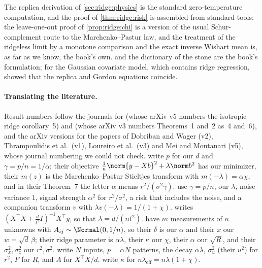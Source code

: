 \begin{refsection}
The replica derivation of \cref{sec:ridge:physics} is the standard zero-temperature computation, and the proof of \cref{thm:ridge:risk} is assembled from standard tools: the leave-one-out proof of \cref{prop:ridge:chi} is a version of the usual Schur-complement route to the Marchenko--Pastur law, and the treatment of the ridgeless limit by a monotone comparison and the exact inverse Wishart mean is, as far as we know, the book's own.  and the dictionary of the stone are the book's formulation; for the Gaussian covariate model, which contains ridge regression, \textcite[Appendix~C]{LoureiroEtAl2022} showed that the replica and Gordon equations coincide.

\paragraph{Translating the literature.} Result numbers follow the journals for \textcite{HastieEtAl2022} (whose arXiv v5 numbers the isotropic ridge corollary~5) and \textcite{BartlettEtAl2020} (whose arXiv v3 numbers Theorems~1 and~2 as~4 and~6), and the arXiv versions for the papers of Dobriban and Wager (v2), Thrampoulidis et al.\ (v1), Loureiro et al.\ (v3) and Mei and Montanari (v5), whose journal numbering we could not check. \textcite{HastieEtAl2022} write $p$ for our $d$ and $\gamma=p/n=1/\alpha$; their objective $\frac1n\norm{y-Xb}^2+\lambda\norm b^2$ has our minimizer, their $m(z)$ is the Marchenko--Pastur Stieltjes transform with $m(-\lambda)=\alpha\chi$, and in their Theorem~7 the letter $\alpha$ means $r^2/(\sigma^2\gamma)$. \textcite{DobribanWager2018} use $\gamma=p/n$, our $\lambda$, noise variance $1$, signal strength $\alpha^2$ for $r^2/\sigma^2$, a risk that includes the noise, and a companion transform $v$ with $\lambda v(-\lambda)=1/(1+\chi)$. \textcite{Dicker2016} writes $(X^\top X+\frac d{t^2}I)^{-1}X^\top y$, so that $\lambda=d/(nt^2)$. \textcite{ThrampoulidisAbbasiHassibi2018} have $m$ measurements of $n$ unknowns with $A_{ij}\sim\Normal(0,1/n)$, so their $\delta$ is our $\alpha$ and their $x$ our $w=\sqrt d\,\beta$; their ridge parameter is $\alpha\lambda$, their $\kappa$ our $\chi$, their $\alpha$ our $\sqrt R$, and their $\sigma_x^2,\sigma_z^2$ our $r^2,\sigma^2$. \textcite{KroghHertz1991} write $N$ inputs, $p=\alpha N$ patterns, the decay $\alpha\lambda$, $\sigma_u^2$ (their $u^2$) for $r^2$, $F$ for $R$, and $A$ for $X^\top X/d$. \textcite{CanatarEtAl2021} write $\kappa$ for $n\lambda_{\mathrm{eff}}=n\lambda(1+\chi)$.

\printchapterbib
\end{refsection}
